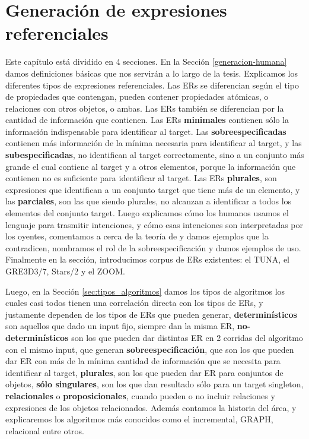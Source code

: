 \chapter{Generaci\'on de expresiones referenciales}
\label{sec:seleccion}

Este cap\'itulo est\'a dividido en 4 secciones. En la Secci\'on \ref{generacion-humana} damos definiciones b\'asicas que nos servir\'an a 
lo largo de la tesis. Explicamos los diferentes tipos de expresiones referenciales. Las ERs se diferencian seg\'un el tipo de propiedades que 
contengan, pueden contener propiedades at\'omicas, o relaciones con otros objetos, o ambas. Las ERs tambi\'en se diferencian por la cantidad 
de informaci\'on que contienen. Las ERs \textbf{minimales} contienen s\'olo la informaci\'on indispensable para identificar al target. Las \textbf{sobreespecificadas} contienen m\'as informaci\'on de la m\'inima necesaria para identificar al target, y las \textbf{subespecificadas}, no identifican al target correctamente, sino a un conjunto m\'as grande el cual contiene al target y a otros elementos, porque la informaci\'on que contienen no es suficiente para identificar al target. Las ERs \textbf{plurales}, son expresiones que identifican a un conjunto target que tiene m\'as de un elemento, y las \textbf{parciales}, son las que siendo plurales, no alcanzan a identificar a todos los elementos del conjunto target. Luego explicamos c\'omo los humanos usamos el lenguaje para trasmitir intenciones, y c\'omo esas intenciones son interpretadas por los oyentes, comentamos a cerca de la teor\'ia de \cite{Clark-Marshall81,clark1992arenas} y damos ejemplos que la contradicen, nombramos el rol de la sobreespecificaci\'on y damos ejemplos de uso. Finalmente en la secci\'on, introducimos corpus de ERs existentes: el TUNA, el GRE3D3/7, Stars/2 y el ZOOM.

Luego, en la Secci\'on \ref{sec:tipos_algoritmos} damos los tipos de algoritmos los cuales casi todos tienen una correlaci\'on directa con los tipos de ERs, y justamente dependen de los tipos de ERs que pueden generar, \textbf{determin\'isticos} son aquellos que dado un input fijo, siempre dan la misma ER, \textbf{no-determin\'isticos} son los que pueden dar distintas ER en 2 corridas del algoritmo con el mismo input, que generan \textbf{sobreespecificaci\'on}, que son los que pueden dar ER con m\'as de la m\'inima cantidad de informaci\'on que se necesita para identificar al target, \textbf{plurales}, son los que pueden dar ER para conjuntos de objetos, \textbf{s\'olo singulares}, son los que dan resultado s\'olo para un target singleton, \textbf{relacionales} o \textbf{proposicionales}, cuando pueden o no incluir relaciones y expresiones de los objetos relacionados. Adem\'as contamos la historia del \'area, y explicaremos los algoritmos m\'as conocidos como el incremental, GRAPH, relacional entre otros. 

